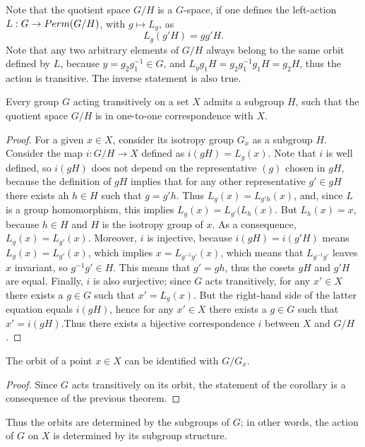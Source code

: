 Note that the quotient space $G/H$ is a $G$-space, if one defines the left-action $L : G \to {Perm}(G/H)$, with $g \mapsto L_g$, as
\begin{equation}
    L_g(g'H) = gg'H.
\end{equation}
Note that any two arbitrary elements of $G/H$ always belong to the same orbit defined by $L$, because $y = g_2g_1^{-1} \in G$, and $L_yg_1H = g_2g_1^{-1}g_1H = g_2H$, thus the action is transitive. The inverse statement is also true.
\begin{teo}
\label{teo: correspondence quotient-set}
    Every group $G$ acting transitively on a set $X$ admits a subgroup $H$, such that the quotient space $G/H$ is in one-to-one correspondence with $X$.
\end{teo}
\begin{proof}
    For a given $x \in X$, consider its isotropy group $G_x$ as a subgroup $H$. Consider the map $i : G/H \to X$ defined as $i(gH) = L_g(x)$. Note that $i$ is well defined, so $i(gH)$ does not depend on the representative $(g)$ chosen in $gH$, because the definition of $gH$ implies that for any other representative $g' \in gH$ there exists ah $h \in H$ such that $g = g'h$. Thus $L_g(x) = L_{g'h}(x)$, and, since $L$ is a group homomorphism, this implies $L_g(x) = L_{g'}(L_h(x)$. But $L_h(x) = x$, because $h \in H$ and $H$ is the isotropy group of $x$. As a consequence, $L_g(x) = L_{g'}(x)$. Moreover, $i$ is injective, because $i(gH) = i(g'H)$ means $L_g(x) = L_{g'}(x)$, which implies $x = L_{g^{-1}g'}(x)$, which means that $L_{g^{-1}g'}$ leaves $x$ invariant, so $g^{-1}g' \in H$. This means that $g' = gh$, thus the cosets $gH$ and $g'H$ are equal. Finally, $i$ is also surjective; since $G$ acts transitively, for any $x' \in X$ there exists a $g \in G$ such that $x' = L_g(x)$. But the right-hand side of the latter equation equals $i(gH)$, hence for any $x' \in X$ there exists a $g \in G$ such that $x' = i(gH)$.Thus there exists a bijective correspondence $i$ between $X$ and $G/H$. 
\end{proof}
\begin{corl}
\label{corl: correspondence quotient-set}
    The orbit of a point $x \in X$ can be identified with $G/G_x$.
\end{corl}
\begin{proof}
    Since $G$ acts transitively on its orbit, the statement of the corollary is a consequence of the previous theorem.
\end{proof}
Thus the orbits are determined by the subgroups of $G$; in other words, the action of $G$ on $X$ is determined by its subgroup structure.

